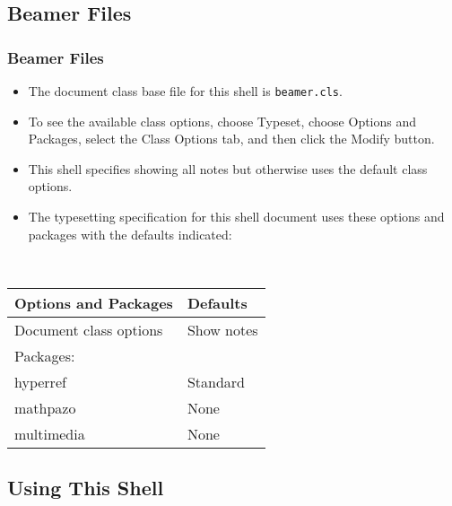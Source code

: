 \documentclass[notes=show]{beamer}%
\begin{document}
\subsection{Beamer Files}%

\begin{frame}%
%

\frametitle{Beamer Files}%


\begin{itemize}
\item The document class base file for this shell is \texttt{beamer.cls}.

\item To see the available class options, choose \textsf{Typeset, }choose
\textsf{Options and Packages}, select the \textsf{Class Options} tab, and then
click the \textsf{Modify} button.

\item This shell specifies showing all notes but otherwise uses the default
class options.

\item The typesetting specification for this shell document uses these options
and packages with the defaults indicated:
\end{itemize}

\begin{center}
\
\begin{tabular}
[c]{ll}%
\textbf{Options and Packages} & \textbf{Defaults}\\\hline
Document class options & Show notes\\
Packages: & \\
\quad hyperref & Standard\\
\quad mathpazo & None\\
\quad multimedia & None\\\hline
\end{tabular}

\end{center}%

\end{frame}%


\subsection{Using This Shell}%
\end{document}

